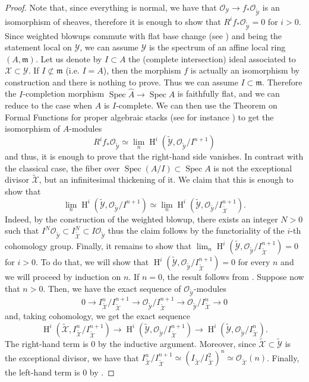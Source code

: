 \documentclass[12pt]{amsart}
\newcommand\spec{\operatorname{Spec}}
\newcommand{\oH}{\operatorname{H}}
\newcommand{\sO}{\mathscr{O}}
\newcommand{\cX}{\mathcal{X}}
\newcommand{\cY}{\mathcal{Y}}
\theoremstyle{definition}
\begin{document}
\begin{proof}
    Note that, since everything is normal, we have that $\sO_{\cY} \rightarrow f_*\sO_{\widetilde{\cY}}$ is an isomorphism of sheaves, therefore it is enough to show that $R^if_*\sO_{\widetilde{\cY}}=0$ for $i>0$. 
    Since weighted blowups commute with flat base change (see \cite[Corollary 3.2.4]{quek-rydh-weighted-blowup}) and being the statement local on $\cY$, we can assume $\cY$ is the spectrum of an affine local ring $(A,\mathfrak{m})$. Let us denote by $I\subset A$ the (complete intersection) ideal associated to $\cX \subset \cY$. If $I \not\subset \mathfrak{m}$ (i.e. $I=A$), then the morphism $f$ is actually an isomorphism by construction and there is nothing to prove. Thus we can assume $I\subset \mathfrak{m}$. Therefore the $I$-completion morphism $\spec \widehat{A} \rightarrow \spec A$ is faithfully flat, and we can reduce to the case when $A$ is $I$-complete. We can then use the Theorem on Formal Functions for proper algebraic stacks (see for instance \cite[Theorem 1.4]{Olss}) to get the isomorphism of $A$-modules
    $$ R^if_*\sO_{\widetilde{\cY}}\simeq  \lim_n\oH^i\left(\widetilde{\cY}, \sO_{\widetilde{\cY}}/I^{n+1}\right)$$
    and thus, it is enough to prove that the right-hand side vanishes. In contrast with the classical case, the fiber over $\spec(A/I) \subset \spec A$ is not the exceptional divisor $\widetilde{\cX}$, but an infinitesimal thickening of it. We claim that this is enough to show that
    $$\lim_n\oH^i\left(\widetilde{\cY}, \sO_{\widetilde{\cY}}/I^{n+1}\right) \simeq \lim_n\oH^i\left(\widetilde{\cY}, \sO_{\widetilde{\cY}}/I_{\widetilde{\cX}}^{n+1}\right).$$
    Indeed, by the construction of the weighted blowup, there exists an integer $N>0$ such that $I^N\sO_{\widetilde{\cY}}\subset I_{\widetilde{\cX}}^N\subset I\sO_{\widetilde{\cY}} $  thus the claim follows by the functoriality of the $i$-th cohomology group.
    Finally, it remains to show that $ \lim_n\oH^i(\widetilde{\cY}, \sO_{\widetilde{\cY}}/I_{\widetilde{\cX}}^{n+1})=0$ for $i>0$. To do that, we will show that $\oH^i(\widetilde{\cY}, \sO_{\widetilde{\cY}}/I_{\widetilde{\cX}}^{n+1})=0$ for every $n$ and we will proceed by induction on $n$. 
    If $n=0$, the result follows from . Suppose now that $n>0$. Then, we have the exact sequence of $\sO_{\widetilde{\cY}}$-modules
    $$ 0 \longrightarrow I_{\widetilde{\cX}}^n/I_{\widetilde{\cX}}^{n+1} \longrightarrow \sO_{\widetilde{\cY}}/I_{\widetilde{\cX}}^{n+1} \longrightarrow \sO_{\widetilde{\cY}}/I_{\widetilde{\cX}}^{n}\longrightarrow 0$$
    and, taking cohomology, we get the exact sequence
    $$ \oH^i\left( \widetilde{\cX}, I_{\widetilde{\cX}}^n/I_{\widetilde{\cX}}^{n+1} \right) \longrightarrow  \oH^i\left( \widetilde{\cY},\sO_{\widetilde{\cY}}/I_{\widetilde{\cX}}^{n+1}  \right)  \longrightarrow \oH^i\left( \widetilde{\cY},\sO_{\widetilde{\cY}}/I_{\widetilde{\cX}}^{n}  \right).$$
    The right-hand term is $0$ by the inductive argument. Moreover, since $\widetilde{\cX}\subset \widetilde{\cY}$ is the exceptional divisor, we have that $I_{\widetilde{\cX}}^n/I_{\widetilde{\cX}}^{n+1}\simeq (I_{\widetilde{\cX}}/I_{\widetilde{\cX}}^2)^n\simeq \sO_{\widetilde{\cX}}(n)$. Finally, the left-hand term is $0$ by .
    \end{proof}
\end{document}
